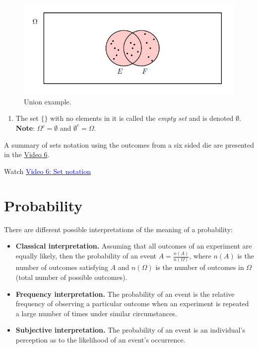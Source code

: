 \documentclass[
]{book}
\providecommand{\tightlist}{%
  \setlength{\itemsep}{0pt}\setlength{\parskip}{0pt}}
\begin{document}
\begin{figure}
\includegraphics[width=0.8\linewidth]{Images/Set4} \caption{ Union example.}\label{fig:Set4}
\end{figure}

\begin{enumerate}
\def\labelenumi{\arabic{enumi}.}
\setcounter{enumi}{6}
\tightlist
\item
  The set \(\{\}\) with no elements in it is called the \emph{empty set} and is denoted \(\emptyset\).\\
  \textbf{Note}: \(\Omega^c = \emptyset\) and \(\emptyset^c = \Omega\).
\end{enumerate}

A summary of sets notation using the outcomes from a six sided die are presented in the \protect\hyperlink{video6}{Video 6}.

Watch \href{https://mediaspace.nottingham.ac.uk/media/Sets+FINAL+VERSION/1_cigsltq1}{\textcolor{blue}{Video 6: Set notation}}

\hypertarget{prob:defn}{%
\section{Probability}\label{prob:defn}}

There are different possible interpretations of the meaning of a probability:

\begin{itemize}
\item
  \textbf{Classical interpretation.}
  Assuming that all outcomes of an experiment are equally likely, then the probability of an event \(A = \frac{n(A)}{n(\Omega)}\), where \(n(A)\) is the number of outcomes satisfying \(A\) and \(n(\Omega)\) is the number of outcomes in \(\Omega\) (total number of possible outcomes).
\item
  \textbf{Frequency interpretation.}
  The probability of an event is the relative frequency of observing a particular outcome when an experiment is repeated a large number of times under similar circumstances.
\item
  \textbf{Subjective interpretation.}
  The probability of an event is an individual's perception as to the likelihood of an event's occurrence.
\end{itemize}
\end{document}
